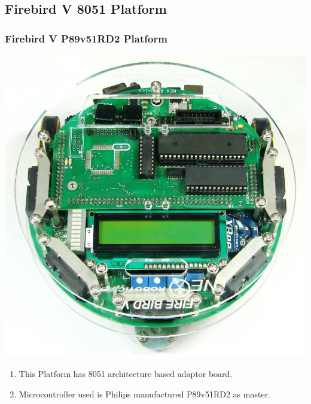 \documentclass[10pt,red]{beamer}
\begin{document}
\subsection{Firebird V 8051 Platform}
\begin{frame}
	\frametitle{Firebird V P89v51RD2 Platform} \pause
		\begin{minipage}[c]{0.4\textwidth}
			\includegraphics[width=\linewidth]{fb_v_8051}
		\end{minipage}
	\pause
	\hfill
		\begin{minipage}[c]{0.5\textwidth}
			\begin{enumerate}
				\item <+-|alert@+> This Platform has 8051 architecture based adaptor board.
				\item <+-|alert@+> Microcontroller used is Philips manufactured P89v51RD2 as master.
			\end{enumerate}
		\end{minipage}   
\end{frame}

\end{document}
